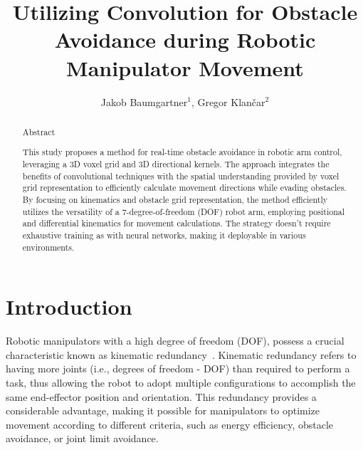 \documentclass[a4paper]{article}
\begin{document}
\title{Utilizing Convolution for Obstacle Avoidance during Robotic Manipulator Movement}

\author{Jakob Baumgartner$^{1}$, Gregor Klančar$^{2}$} %



\maketitle


\begin{abstract}{Abstract}

This study proposes a method for real-time obstacle avoidance in robotic arm control, leveraging a 3D voxel grid and 3D directional kernels. The approach integrates the benefits of convolutional techniques with the spatial understanding provided by voxel grid representation to efficiently calculate movement directions while evading obstacles. By focusing on kinematics and obstacle grid representation, the method efficiently utilizes the versatility of a 7-degree-of-freedom (DOF) robot arm, employing positional and differential kinematics for movement calculations. The strategy doesn't require exhaustive training as with neural networks, making it deployable in various environments.

\end{abstract}



\section{Introduction }

Robotic manipulators with a high degree of freedom (DOF), possess a crucial characteristic known as kinematic redundancy~\cite{Nguyen1991}. Kinematic redundancy refers to having more joints (i.e., degrees of freedom - DOF) than required to perform a task, thus allowing the robot to adopt multiple configurations to accomplish the same end-effector position and orientation. This redundancy provides a considerable advantage, making it possible for manipulators to optimize movement according to different criteria, such as energy efficiency, obstacle avoidance, or joint limit avoidance.
\end{document}
